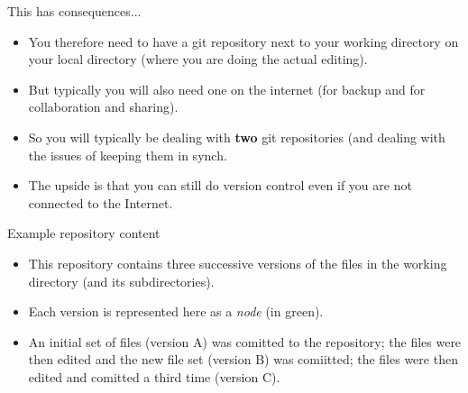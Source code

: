 \documentclass[usenames,dvipsnames]{beamer}
\begin{document}
\begin{frame}{This has consequences...}
  \begin{block}{}
    \begin{itemize}
      \item{You therefore need to have a git repository next to your working directory on your local directory (where you are doing the actual editing).}
      \item{But typically you will also need one on the internet (for backup and for collaboration and sharing).}
      \item{So you will typically be dealing with \textbf{two} git repositories (and dealing with the issues of keeping them in synch.}
    \end{itemize}
    \begin{itemize}
      \item{The upside is that you can still do version control even if you are not connected to the Internet.}
    \end{itemize}
  \end{block}
\end{frame}

\begin{frame}{Example repository content}
  \begin{figure}
    \begin{center}
    \end{center}
  \end{figure}
  \begin{block}{}
    \begin{itemize}
      \item{This repository contains three successive versions of the files in the working directory (and its subdirectories).}
      \item{Each version is represented here as a \textit{node} (in green).}
      \item{An initial set of files (version A) was comitted to the repository; the files were then edited and the new file set (version B) was comiitted; the files were then edited and comitted a third time (version C).}
    \end{itemize}
  \end{block}
\end{frame}
\end{document}
